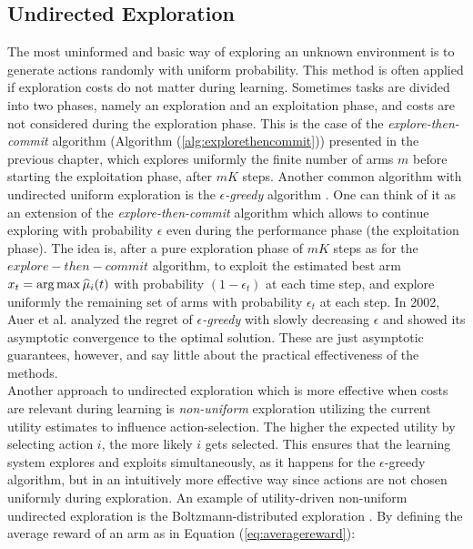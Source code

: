 \subsection{Undirected Exploration}
The most uninformed and basic way of exploring an unknown environment is to generate actions randomly with uniform probability. This method is often applied if exploration costs do not matter during learning. Sometimes tasks are divided into two phases, namely an exploration and an exploitation phase, and costs are not considered during the exploration phase. This is the case of the \emph{explore-then-commit} algorithm (Algorithm (\ref{alg:explorethencommit})) presented in the previous chapter, which explores uniformly the finite number of arms $m$ before starting the exploitation phase, after $mK$ steps. Another common algorithm with undirected uniform exploration is the $\epsilon$\emph{-greedy} algorithm \cite{lattimore2019bandit}. One can think of it as an extension of the \emph{explore-then-commit} algorithm which allows to continue exploring with probability $\epsilon$ even during the performance phase (\ie the exploitation phase). The idea is, after a pure exploration phase of $mK$ steps as for the $explore-then-commit$ algorithm, to exploit the estimated best arm $x_t = \arg \max \widehat{\mu}_i(t)$ with probability $(1-\epsilon_t)$ at each time step, and explore uniformly the remaining set of arms with probability $\epsilon_t$ at each step. In 2002, Auer et al. \cite{auer2002finite} analyzed the regret of $\epsilon$\emph{-greedy} with slowly decreasing $\epsilon$ and showed its asymptotic convergence to the optimal solution. These are just asymptotic guarantees, however, and say little about the practical effectiveness of the methods.\\
Another approach to undirected exploration which is more effective when costs are relevant during learning is \emph{non-uniform} exploration utilizing the current utility estimates to influence action-selection. The higher the expected utility by selecting action $i$, the more likely $i$ gets selected. This ensures that the learning system explores and exploits simultaneously, as it happens for the $\epsilon$-greedy algorithm, but in an intuitively more effective way since actions are not chosen uniformly during exploration. An example of utility-driven non-uniform undirected exploration is the  Boltzmann-distributed exploration \cite{cesa2017boltzmann}. By defining the average reward of an arm as in Equation (\ref{eq:averagereward}):

